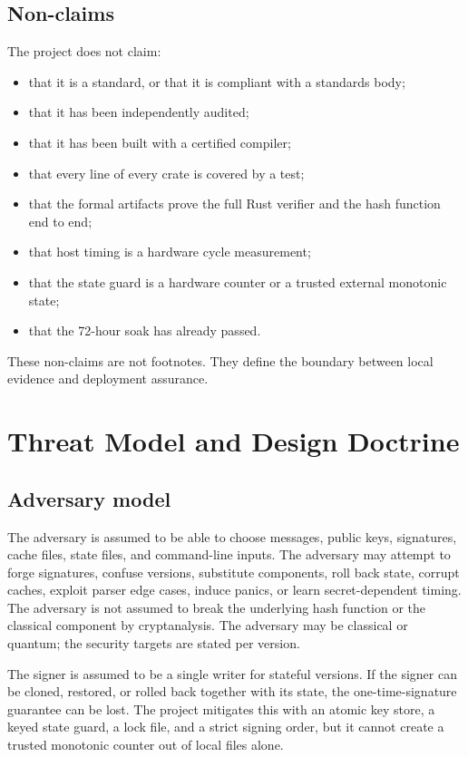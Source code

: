 \documentclass[11pt,a4paper]{article}
\begin{document}
\subsection{Non-claims}

The project does not claim:

\begin{itemize}
  \item that it is a standard, or that it is compliant with a standards body;
  \item that it has been independently audited;
  \item that it has been built with a certified compiler;
  \item that every line of every crate is covered by a test;
  \item that the formal artifacts prove the full Rust verifier and the hash
  function end to end;
  \item that host timing is a hardware cycle measurement;
  \item that the state guard is a hardware counter or a trusted external
  monotonic state;
  \item that the 72-hour soak has already passed.
\end{itemize}

These non-claims are not footnotes. They define the boundary between local
evidence and deployment assurance.

\section{Threat Model and Design Doctrine}

\subsection{Adversary model}

The adversary is assumed to be able to choose messages, public keys,
signatures, cache files, state files, and command-line inputs. The adversary
may attempt to forge signatures, confuse versions, substitute components, roll
back state, corrupt caches, exploit parser edge cases, induce panics, or learn
secret-dependent timing. The adversary is not assumed to break the underlying
hash function or the classical component by cryptanalysis. The adversary may
be classical or quantum; the security targets are stated per version.

The signer is assumed to be a single writer for stateful versions. If the
signer can be cloned, restored, or rolled back together with its state, the
one-time-signature guarantee can be lost. The project mitigates this with an
atomic key store, a keyed state guard, a lock file, and a strict signing order,
but it cannot create a trusted monotonic counter out of local files alone.
\end{document}
